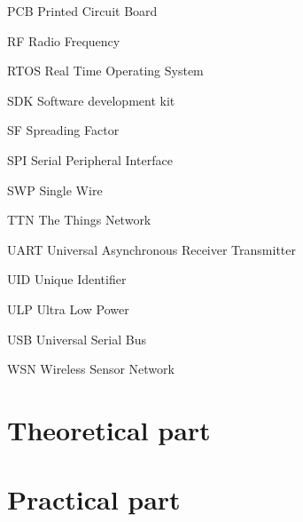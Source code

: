 \documentclass[oneside]{ctuthesis}
\theoremstyle{plain}
\theoremstyle{definition}
\theoremstyle{note}
\newcommand{\abbrlabel}[1]{\makebox[3cm][l]{\textbf{#1}\ \dotfill}}
\newenvironment{abbreviations}{\begin{list}{}{\renewcommand{\makelabel}{\abbrlabel}}}{\end{list}}
\begin{document}
\begin{abbreviations}
	\item[PCB]		Printed Circuit Board 
	\item[RF]		Radio Frequency
	\item[RTOS]		Real Time Operating System 
	\item[SDK]	 	Software development kit
	\item[SF]		Spreading Factor
	\item[SPI]   	Serial Peripheral Interface 
	\item[SWP]		Single Wire 
	\item[TTN] 		The Things Network
	\item[UART]		Universal Asynchronous Receiver Transmitter 
	\item[UID]		Unique Identifier 
	\item[ULP]		Ultra Low Power 
	\item[USB]		Universal Serial Bus 
	\item[WSN]		Wireless Sensor Network

\end{abbreviations}






\part{Theoretical part}
									



\part{Practical part}








\end{document}
